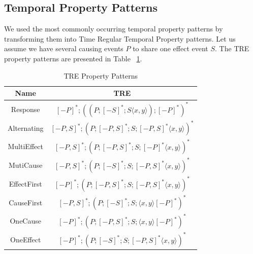 \documentclass[]{sigplanconf}
\begin{document}
\subsection{Temporal Property Patterns}

We used the most commonly occurring temporal property patterns \cite{evans} by transforming them into Time Regular Temporal Property patterns. Let us assume we have several causing events $P$ to share one effect event $S$. The TRE property patterns are presented in Table ~\ref{TRE_Exp}.
\begin{table}[ht]
  \centering
  \begin{tabular}{|c|c|}
  \hline
  \textbf{Name} & \textbf{TRE}  \\ \hline
  Response      & $[-P]^*;((P;[-S]^*;S \langle x,y \rangle);[-P]^*)^*$        \\ \hline
  Alternating   & $[-P,S]^*;(P;[-P,S]^*;S;[-P,S]^* \langle x,y \rangle)^*$       \\ \hline
  MultiEffect   &  $[-P,S]^*;(P;[-P,S]^*;S;[-P]^* \langle x,y \rangle)^*$     \\ \hline
  MutiCause     &  $[-P,S]^*;(P;[-S]^*;S;[-P,S]^* \langle x,y \rangle)^*$     \\ \hline
  EffectFirst   &  $[-P]^*;(P;[-P,S]^*;S;[-P,S]^* \langle x,y \rangle)^*$      \\ \hline
  CauseFirst    &  $[-P,S]^*;(P;[-S]^*;S;\langle x,y \rangle [-P]^*)^*$       \\ \hline
  OneCause      &  $[-P]^*;(P;[-P,S]^*;S;\langle x,y \rangle [-P]^*)^*$       \\ \hline
  OneEffect     &  $[-P]^*;(P;[-S]^*;S;[-P,S]^* \langle x,y \rangle)^*$       \\ \hline
\end{tabular}
\caption{TRE Property Patterns}\label{TRE_Exp}
\end{table}
\end{document}

